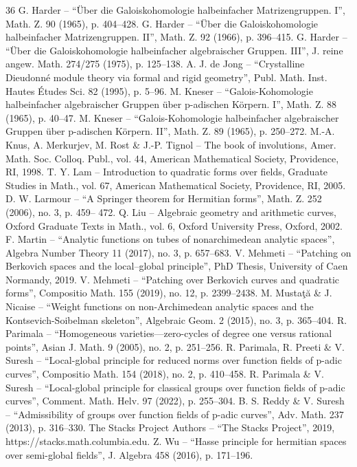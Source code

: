 \begin{thebibliography}{36}
 G. Harder – “Über die Galoiskohomologie halbeinfacher Matrizengruppen. I”, Math. Z. 90 (1965), p. 404–428.
 G. Harder – “Über die Galoiskohomologie halbeinfacher Matrizengruppen. II”, Math. Z. 92 (1966), p. 396–415.
 G. Harder – “Über die Galoiskohomologie halbeinfacher algebraischer Gruppen. III”, J. reine angew. Math. 274/275 (1975), p. 125–138.
 A. J. de Jong – “Crystalline Dieudonné module theory via formal and rigid geometry”, Publ. Math. Inst. Hautes Études Sci. 82 (1995), p. 5–96.
 M. Kneser – “Galois-Kohomologie halbeinfacher algebraischer Gruppen über p-adischen Körpern. I”, Math. Z. 88 (1965), p. 40–47.
 M. Kneser – “Galois-Kohomologie halbeinfacher algebraischer Gruppen über p-adischen Körpern. II”, Math. Z. 89 (1965), p. 250–272.
 M.-A. Knus, A. Merkurjev, M. Rost \& J.-P. Tignol – The book of involutions, Amer. Math. Soc. Colloq. Publ., vol. 44, American Mathematical Society, Providence, RI, 1998.
 T. Y. Lam – Introduction to quadratic forms over fields, Graduate Studies in Math., vol. 67, American Mathematical Society, Providence, RI, 2005.
 D. W. Larmour – “A Springer theorem for Hermitian forms”, Math. Z. 252 (2006), no. 3, p. 459– 472.
 Q. Liu – Algebraic geometry and arithmetic curves, Oxford Graduate Texts in Math., vol. 6, Oxford University Press, Oxford, 2002.
 F. Martin – “Analytic functions on tubes of nonarchimedean analytic spaces”, Algebra Number Theory 11 (2017), no. 3, p. 657–683.
 V. Mehmeti – “Patching on Berkovich spaces and the local–global principle”, PhD Thesis, University of Caen Normandy, 2019.
 V. Mehmeti – “Patching over Berkovich curves and quadratic forms”, Compositio Math. 155 (2019), no. 12, p. 2399–2438.
 M. Mustaţă \& J. Nicaise – “Weight functions on non-Archimedean analytic spaces and the Kontsevich-Soibelman skeleton”, Algebraic Geom. 2 (2015), no. 3, p. 365–404.
 R. Parimala – “Homogeneous varieties—zero-cycles of degree one versus rational points”, Asian J. Math. 9 (2005), no. 2, p. 251–256.
 R. Parimala, R. Preeti \& V. Suresh – “Local-global principle for reduced norms over function fields of p-adic curves”, Compositio Math. 154 (2018), no. 2, p. 410–458.
 R. Parimala \& V. Suresh – “Local-global principle for classical groups over function fields of p-adic curves”, Comment. Math. Helv. 97 (2022), p. 255–304.
 B. S. Reddy \& V. Suresh – “Admissibility of groups over function fields of p-adic curves”, Adv. Math. 237 (2013), p. 316–330.
 The Stacks Project Authors – “The Stacks Project”, 2019, https://stacks.math.columbia.edu.
 Z. Wu – “Hasse principle for hermitian spaces over semi-global fields”, J. Algebra 458 (2016), p. 171–196.
\end{thebibliography}
